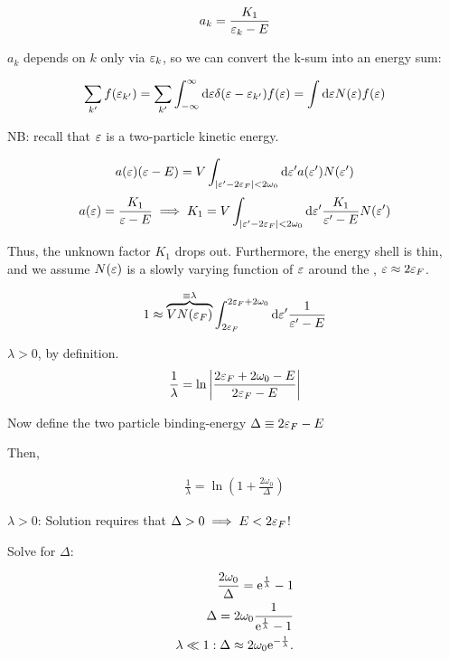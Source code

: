 \begin{align*}
a_k = \frac{K_1}{\varepsilon_k - E}
\end{align*}

$a_k$ depends on $k$ only via $\varepsilon_k$, so we can convert the k-sum into an energy sum: 

\begin{align*}
\sum_{k'}f(\varepsilon_{k'}) = \sum_{k'} \int_{-\infty}^{\infty} \dd \varepsilon  \delta(\varepsilon - \varepsilon_{k'})f(\varepsilon) = \int \dd \varepsilon N(\varepsilon) f(\varepsilon)
\end{align*}

NB: recall that $\varepsilon$ is a two-particle kinetic energy. 

\begin{align*}
a(\varepsilon)(\varepsilon - E) = V\int_{\abs{\varepsilon' - 2\varepsilon_F} < 2\omega_0} \dd \varepsilon' a(\varepsilon') N(\varepsilon') 
\end{align*}
\begin{align*}
a(\varepsilon) = \frac{K_1}{\varepsilon - E} \implies K_1 = V\int_{\abs{\varepsilon' - 2\varepsilon_F} < 2\omega_0} \dd \varepsilon' \frac{K_1}{\varepsilon' - E} N(\varepsilon') 
\end{align*}

Thus, the unknown factor $K_1$ drops out. Furthermore, the energy shell is thin, and we assume $N(\varepsilon)$ is a slowly varying function of $\varepsilon$ around the , $\varepsilon \approx 2\varepsilon_F$. 

\begin{align*}
1 \approx \overbrace{VN(\varepsilon_F)}^{\equiv \lambda} \int_{2\varepsilon_F}^{2\varepsilon_F + 2\omega_0} \dd \varepsilon' \frac{1}{\varepsilon' - E}
\end{align*}

$\lambda > 0$, by definition. \\
\begin{align*}
\frac{1}{\lambda} = \ln \abs{\frac{2\varepsilon_F + 2\omega_0 -E}{2\varepsilon_F - E}}
\end{align*}

Now define the two particle binding-energy $\Delta \equiv 2\varepsilon_F - E$

Then, 

\begin{align*}
\frac{1}{\lambda} = \ln \left(1 + \frac{2\omega_0}{\Delta}\right)
\end{align*}

$\lambda > 0$: Solution requires that $\Delta > 0 \implies E < 2\varepsilon_F$!

Solve for $\Delta$: 

\begin{align*}
\frac{2\omega_0}{\Delta} = \mathrm{e}^{\frac{1}{\lambda}} - 1 \\
\Delta = 2\omega_0 \frac{1}{\mathrm{e}^{\frac{1}{\lambda}} - 1 } \\
\lambda \ll 1: \Delta \approx 2\omega_0 \mathrm{e}^{-\frac{1}{\lambda}}.
\end{align*}

